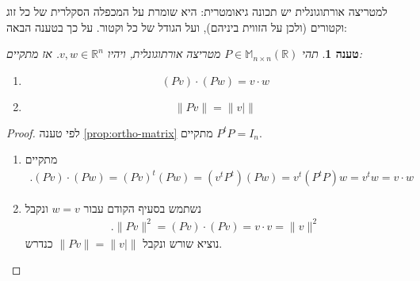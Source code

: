 \documentclass[12pt]{report}
\theoremstyle{plain}
\newtheorem{proposition}[theorem]{טענה}
\theoremstyle{definition}
\newcommand{\R}{\mathbb{R}}
\newcommand{\M}{\mathbb{M}}
\newcommand{\0}{\mathbf{0}}
\begin{document}
למטריצה אורתוגונלית יש תכונה גיאומטרית: היא שומרת על המכפלה הסקלרית של כל זוג וקטורים (ולכן על הזווית ביניהם), ועל הגודל של כל וקטור. על כך בטענה הבאה:

\begin{proposition}
תהי
$P\in\M_{n\times n}(\R)$
מטריצה אורתוגונלית, ויהיו
$v,w\in\R^n$. 
אז מתקיים:

\begin{enumerate}[label=\alph*.]
\item
$$
(Pv)\cdot (Pw)=v\cdot w
$$


\item 
$$
\|Pv\|=\|v|\|
$$


\end{enumerate}
\end{proposition}

\begin{proof}
לפי טענה 
\ref{prop:ortho-matrix}
מתקיים
$P^tP=I_n$.

\begin{enumerate}[label=\alph*.]
\item
מתקיים
$$
\begin{aligned}
.(Pv)\cdot (Pw)=(Pv)^t(Pw)=(v^tP^t)(Pw)=v^t(P^tP)w=v^tw=v\cdot w
\end{aligned}
$$

\item
נשתמש בסעיף הקודם עבור
$w=v$
ונקבל
$$
\begin{aligned}
.\|Pv\|^2=(Pv)\cdot (Pv)=v\cdot v=\|v\|^2
\end{aligned}
$$
נוציא שורש ונקבל
$\|Pv\|=\|v|\|$
כנדרש.


\end{enumerate}
\end{proof}
\end{document}
